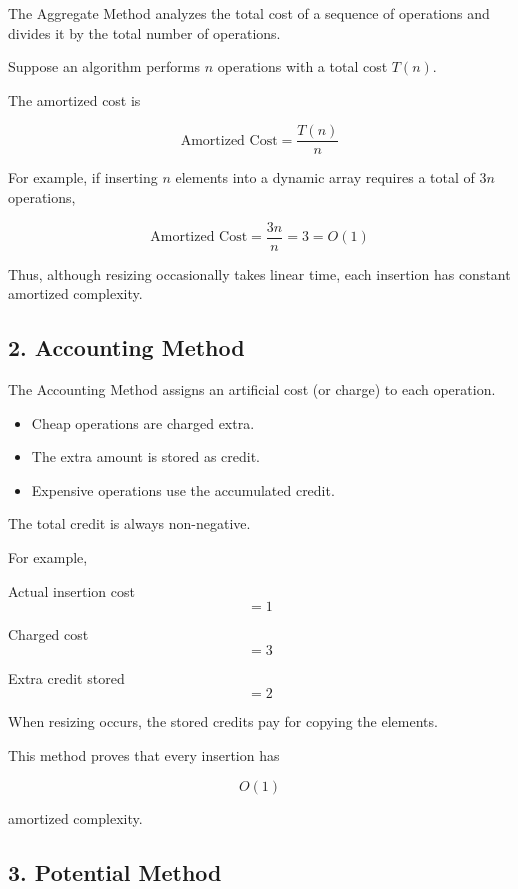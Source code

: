 \documentclass[12pt,a4paper]{article}
\begin{document}
The Aggregate Method analyzes the total cost of a sequence of operations and divides it by the total number of operations.

Suppose an algorithm performs $n$ operations with a total cost $T(n)$.

The amortized cost is

\[
\text{Amortized Cost}
=
\frac{T(n)}{n}
\]

For example, if inserting $n$ elements into a dynamic array requires a total of $3n$ operations,

\[
\text{Amortized Cost}
=
\frac{3n}{n}
=
3
=
O(1)
\]

Thus, although resizing occasionally takes linear time, each insertion has constant amortized complexity.


\subsection*{2. Accounting Method}

The Accounting Method assigns an artificial cost (or charge) to each operation.

\begin{itemize}
\item Cheap operations are charged extra.
\item The extra amount is stored as credit.
\item Expensive operations use the accumulated credit.
\end{itemize}

The total credit is always non-negative.

For example,

Actual insertion cost
\[
=1
\]

Charged cost
\[
=3
\]

Extra credit stored
\[
=2
\]

When resizing occurs, the stored credits pay for copying the elements.

This method proves that every insertion has

\[
O(1)
\]

amortized complexity.


\subsection*{3. Potential Method}
\end{document}
